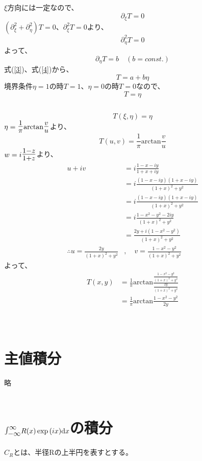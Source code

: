 \documentclass[dvipdfmx,a4paper]{jsarticle}
\begin{document}
\subsection{}
$\xi$方向には一定なので、
\begin{equation}
\label{3}
\partial_{\xi}T = 0
\end{equation}
$(\partial^2_{\xi} + \partial^2_{\eta})T = 0$、$\partial^2_{\xi}T = 0$より、$$\partial^2_{\eta}T = 0$$
よって、
\begin{equation}
\label{4}
\partial_{\eta}T = b \quad(b = const.)
\end{equation}
式(\ref{3})、式(\ref{4})から、
$$
T = a + b\eta
$$
境界条件$\eta = 1$の時$T = 1$、$\eta = 0$の時$T = 0$なので、
$$
T = \eta
$$

\subsection{}
$$T(\xi, \eta) = \eta$$
$\eta = \mbox{\Large$\frac{1}{\pi}$}\mathrm{arctan}\mbox{\Large$\frac{v}{u}$}$より、
$$T(u, v) = \frac{1}{\pi}\mathrm{arctan}\frac{v}{u}$$
$w = i\mbox{\Large$\frac{1-z}{1+z}$}$より、
\begin{align*}
u + iv &= i\frac{1-x-iy}{1+x+iy}\\
&= i\frac{(1-x-iy)(1+x-iy)}{(1+x)^2 + y^2}\\
&= i\frac{(1-x-iy)(1+x-iy)}{(1+x)^2 + y^2}\\
&= i\frac{1-x^2-y^2-2iy}{(1+x)^2 + y^2}\\
&= \frac{2y + i(1-x^2-y^2)}{(1+x)^2 + y^2}\\
\therefore u = \frac{2y}{(1+x)^2 + y^2}&,\quad v =  \frac{1-x^2-y^2}{(1+x)^2 + y^2}
\end{align*}
よって、
\begin{align*}
T(x, y) &= \frac{1}{\pi}\mathrm{arctan}\frac{\frac{1-x^2-y^2}{(1+x)^2 + y^2}}{\frac{2y}{(1+x)^2 + y^2}}\\
&=\frac{1}{\pi}\mathrm{arctan}\frac{1-x^2-y^2}{2y}
\end{align*}
\\\\

\section{主値積分}
略
\\\\

\section{$\mbox{\Large$\int_{-\infty}^{\infty}$}R(x)\exp{(ix)}\mathrm{d}x$の積分}
$C_R$とは、半径Rの上半円を表すとする。
\end{document}

